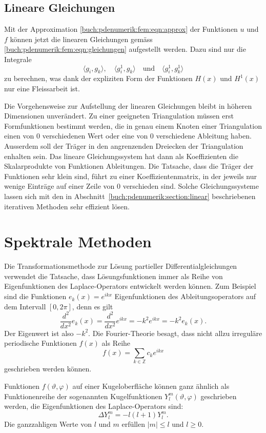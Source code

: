 %
%
\subsection{Lineare Gleichungen}
Mit der Approximation \eqref{buch:pdenumerik:fem:eqn:approx} der
Funktionen $u$ und $f$ können jetzt die linearen Gleichungen 
gemäss \eqref{buch:pdenumerik:fem:eqn:gleichungen} aufgestellt werden.
Dazu sind nur die Integrale
\[
\langle g_i,g_k\rangle,\quad
\langle g^1_i,g_k\rangle
\quad \text{und}\quad
\langle g^1_i,g^1_k\rangle
\]
zu berechnen, was dank der expliziten Form der Funktionen $H(x)$ und
$H^1(x)$ nur eine Fleissarbeit ist.

Die Vorgehensweise zur Aufstellung der linearen Gleichungen bleibt
in höheren Dimensionen unverändert.
Zu einer geeigneten Triangulation müssen erst Formfunktionen bestimmt
werden, die in genau einem Knoten einer Triangulation einen von 0
verschiedenen Wert oder eine von 0 verschiedene Ableitung haben.
Ausserdem soll der Träger in den angrenzenden Dreiecken der Triangulation
enhalten sein.
Das lineare Gleichungssystem hat dann als Koeffizienten die Skalarprodukte
von Funktionen Ableitungen.
Die Tatsache, dass die Träger der Funktionen sehr klein sind, führt
zu einer Koeffizientenmatrix, in der jeweils nur wenige Einträge
auf einer Zeile von 0 verschieden sind.
Solche Gleichungssysteme lassen sich mit den in
Abschnitt~\ref{buch:pdenumerik:section:linear} beschriebenen
iterativen Methoden sehr effizient lösen.


%
%
\section{Spektrale Methoden
\label{buch:pdenumerik:section:spektral}}
Die Transformationsmethode zur Lösung partieller Differentialgleichungen
verwendet die Tatsache, dass Lösungsfunktionen immer als Reihe von
Eigenfunktionen des Laplace-Operators entwickelt werden können.
Zum Beispiel sind die Funktionen
\(
e_k(x) = e^{ikx}
\)
Eigenfunktionen des Ableitungsoperators auf dem Intervall $[0,2\pi]$,
denn es gilt
\[
\frac{d^2}{dx^2} e_k(x)
=
\frac{d^2}{dx^2} e^{ikx}
=
-k^2 e^{ikx}
=
-k^2 e_k(x).
\]
Der Eigenwert ist also $-k^2$.
Die Fourier-Theorie besagt, dass nicht allzu irreguläre periodische
Funktionen $f(x)$ als Reihe
\[
f(x)
=
\sum_{k\in\mathbb{Z}} c_ke^{ikx}
\]
geschrieben werden können.

Funktionen $f(\vartheta,\varphi)$ auf einer Kugeloberfläche können
ganz ähnlich als Funktionenreihe der sogenannten Kugelfunktionen
$Y^m_l(\vartheta,\varphi)$ geschrieben werden, die Eigenfunktionen
des Laplace-Operators sind:
\[
\Delta Y^m_l
=
-l(l+1) Y^m_l.
\]
Die ganzzahligen Werte von $l$ und $m$ erfüllen $|m|\le l$ und $l\ge 0$.

